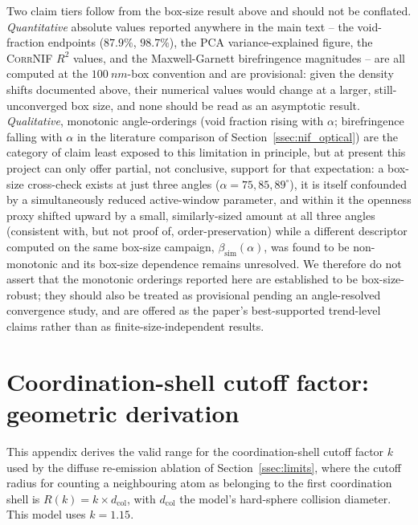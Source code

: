 \documentclass[aip,amsmath,amssymb,reprint]{revtex4-1}
\newcommand{\dang}{\ensuremath{\alpha}}
\begin{document}
Two claim tiers follow from the box-size result above and should not be
conflated. \emph{Quantitative} absolute values reported anywhere in the
main text -- the void-fraction endpoints ($87.9\%$, $98.7\%$), the PCA
variance-explained figure, the \textsc{CorrNIF} $R^2$ values, and the
Maxwell-Garnett birefringence magnitudes -- are all computed at the
$\SI{100}{nm}$-box convention and are provisional: given the density
shifts documented above, their numerical values would change at a larger,
still-unconverged box size, and none should be read as an asymptotic
result. \emph{Qualitative}, monotonic angle-orderings (void fraction
rising with $\dang$; birefringence falling with $\dang$ in the literature
comparison of Section~\ref{ssec:nif_optical}) are the category of claim
least exposed to this limitation in principle, but at present this project
can only offer partial, not conclusive, support for that expectation: a
box-size cross-check exists at just three angles ($\dang = 75, 85,
89^{\circ}$), it is itself confounded by a simultaneously reduced
active-window parameter, and within it the openness proxy shifted upward
by a small, similarly-sized amount at all three angles (consistent with,
but not proof of, order-preservation) while a different descriptor
computed on the same box-size campaign, $\beta_{\mathrm{sim}}(\dang)$, was
found to be non-monotonic and its box-size dependence remains unresolved.
We therefore do not assert that the monotonic orderings reported here are
established to be box-size-robust; they should also be treated as
provisional pending an angle-resolved convergence study, and are offered
as the paper's best-supported trend-level claims rather than as
finite-size-independent results.

\section{Coordination-shell cutoff factor: geometric derivation}
\label{app:shellcutoff}

This appendix derives the valid range for the coordination-shell cutoff
factor $k$ used by the diffuse re-emission ablation of
Section~\ref{ssec:limits}, where the cutoff radius for counting a
neighbouring atom as belonging to the first coordination shell is
$R(k) = k \times d_{\mathrm{col}}$, with $d_{\mathrm{col}}$ the model's
hard-sphere collision diameter. This model uses $k=1.15$.
\end{document}

